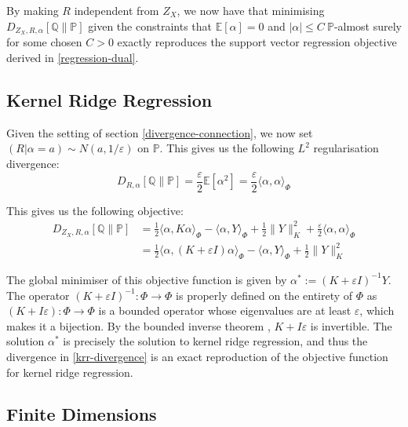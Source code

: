 \documentclass{article}
\begin{document}
By making $R$ independent from $Z_X$, we now have that minimising $D_{Z_X , R , \alpha}[\mathbb{Q}\|\mathbb{P}]$ given the constraints that $\mathbb{E}[\alpha] = 0$ and $|\alpha | \leq C \ \mathbb{P}$-almost surely for some chosen $C > 0$ exactly reproduces the support vector regression objective derived in \ref{regression-dual}.

\subsection{Kernel Ridge Regression}

Given the setting of section \ref{divergence-connection}, we now set $(R |\alpha = a) \sim N(a ,1/\varepsilon)$ on $\mathbb{P}$. This gives us the following $L^2$ regularisation divergence:
\begin{equation}
D_{R ,\alpha}[\mathbb{Q}\|\mathbb{P}] = \frac{\varepsilon}{2} \mathbb{E}[\alpha^2] = \frac{\varepsilon}{2} \langle \alpha , \alpha \rangle_{\Phi}
\end{equation}

This gives us the following objective:
\begin{align} \label{krr-divergence}
D_{Z_X , R ,\alpha}[\mathbb{Q}\|\mathbb{P}] & = \frac{1}{2} \langle \alpha , K \alpha \rangle_{\Phi} - \langle \alpha , Y \rangle_{\Phi} + \frac{1}{2}\| Y\|_K^2 + \frac{\varepsilon}{2} \langle \alpha , \alpha \rangle_{\Phi} \\
 & = \frac{1}{2} \langle \alpha , (K + \varepsilon I) \alpha \rangle_{\Phi} - \langle \alpha , Y \rangle_{\Phi} + \frac{1}{2}\| Y\|_K^2
\end{align}

The global minimiser of this objective function is given by $\alpha^{*} := (K + \varepsilon I)^{- 1} Y$. The operator $(K + \varepsilon I)^{- 1} : \Phi \rightarrow \Phi$ is properly defined on the entirety of $\Phi$ as $(K + I \varepsilon) : \Phi \rightarrow \Phi$ is a bounded operator whose eigenvalues are at least $\varepsilon$, which makes it a bijection. By the bounded inverse theorem \cite[Theorem 4.12.2]{Kreyszig1978IntroductoryFA}, $K + I \varepsilon$ is invertible. The solution $\alpha^{*}$ is precisely the solution to kernel ridge regression, and thus the divergence in \ref{krr-divergence} is an exact reproduction of the objective function for kernel ridge regression.

\subsection{Finite Dimensions}
\end{document}

